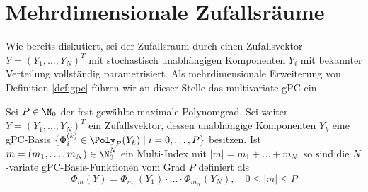 \section{Mehrdimensionale Zufallsräume}
Wie bereits diskutiert, sei der Zufallsraum durch einen Zufallsvektor $Y=(Y_1,\dots,Y_N)^T$ mit stochastisch unabhängigen Komponenten $Y_i$ mit bekannter Verteilung vollständig parametrisiert. Als mehrdimensionale Erweiterung von Definition \ref{def:gpc} führen wir an dieser Stelle das multivariate gPC-ein.
\begin{mathdef}
Sei $P\in\N_0$ der fest gewählte maximale Polynomgrad. Sei weiter $Y=(Y_1,\dots,Y_N)^T$ ein Zufallsvektor, dessen unabhängige Komponenten $Y_k$ eine gPC-Basis $\lbrace \Phi_i^{(k)}\in\Poly_P(Y_k)\mid i=0,\dots,P\rbrace$ besitzen. Ist $m=(m_1,\dots,m_N)\in\N_0^N$ ein Multi-Index mit $|m|=m_1+\dots+m_N$, so sind die $N$-variate gPC-Basis-Funktionen vom Grad $P$ definiert als 
\[\Phi_m(Y)=\Phi_{m_1}(Y_1)\cdot\ldots\cdot\Phi_{m_N}(Y_N),\quad 0\le |m|\le P\]
\end{mathdef}

